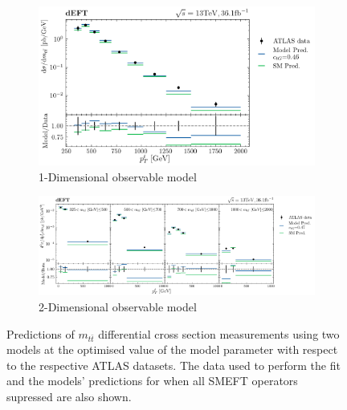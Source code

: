 \documentclass[a4paper,11pt]{article}
\begin{document}
\begin{figure}[htb]
    \centering
    \begin{subfigure}[b]{0.8\textwidth}
        \centering
        \includegraphics[width=\textwidth]{plots/ATLAS_model_result_1D_1OP.png}
        \caption{1-Dimensional observable model}
    \end{subfigure}
    \par\bigskip
    \begin{subfigure}[b]{\textwidth}
        \centering
        \includegraphics[width=\textwidth]{plots/ATLAS_model_result_2D_1OP.png}
        \caption{2-Dimensional observable model}
    \end{subfigure}
    \caption{Predictions of $m_{t\bar{t}}$ differential cross section measurements using two models at the optimised value of the model parameter with respect to the respective ATLAS datasets. The data used to perform the fit and the models' predictions for when all SMEFT operators supressed are also shown.}
    \label{fig:model_result_1OP}
\end{figure}
\end{document}
